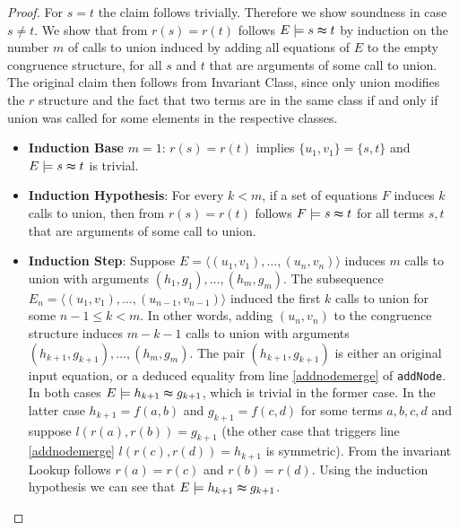 \begin{proof}
\noindent For $s = t$ the claim follows trivially.
Therefore we show soundness in case $s \neq t$.
We show that from $r(s) = r(t)$ follows $E \models s \thickapprox t$ by induction on the number $m$ of calls to union induced by adding all equations of $E$ to the empty congruence structure, for all $s$ and $t$ that are arguments of some call to union.
The original claim then follows from Invariant Class, since only union modifies the $r$ structure and the fact that two terms are in the same class if and only if union was called for some elements in the respective classes.
\begin{itemize}
\item \textbf{Induction Base} $m = 1$: $r(s) = r(t)$ implies $\{u_1,v_1\} = \{s,t\}$ and $E \models s \thickapprox t$ is trivial.


\item \textbf{Induction Hypothesis}: For every $k < m$, if a set of equations $F$ induces $k$ calls to union, then from $r(s) = r(t)$ follows $F \models s \thickapprox t$ for all terms $s,t$ that are arguments of some call to union.

\item \textbf{Induction Step}: Suppose $E = \langle (u_1,v_1), \ldots, (u_n,v_n) \rangle$ induces $m$ calls to union with arguments $(h_1,g_1),\ldots,(h_m,g_m)$.
The subsequence $E_n = \langle (u_1,v_1), \ldots, (u_{n-1},v_{n-1}) \rangle$ induced the first $k$ calls to union for some $n-1 \leq k < m$.
In other words, adding $(u_n,v_n)$ to the congruence structure induces $m-k-1$ calls to union with arguments $(h_{k+1},g_{k+1}),\ldots,(h_m,g_m)$.
The pair $(h_{k+1},g_{k+1})$ is either an original input equation, or a deduced equality from line \ref{addnodemerge} of \texttt{addNode}.
In both cases $E \models h_{k+1} \thickapprox g_{k+1}$, which is trivial in the former case.
In the latter case $h_{k+1} = f(a,b)$ and $g_{k+1} = f(c,d)$ for some terms $a,b,c,d$ and suppose $l(r(a),r(b)) = g_{k+1}$ (the other case that triggers line \ref{addnodemerge} $l(r(c),r(d)) = h_{k+1}$ is symmetric).
From the invariant Lookup follows $r(a) = r(c)$ and $r(b) = r(d)$.
Using the induction hypothesis we can see that $E \models h_{k+1} \thickapprox g_{k+1}$.


\end{itemize}
\end{proof}
